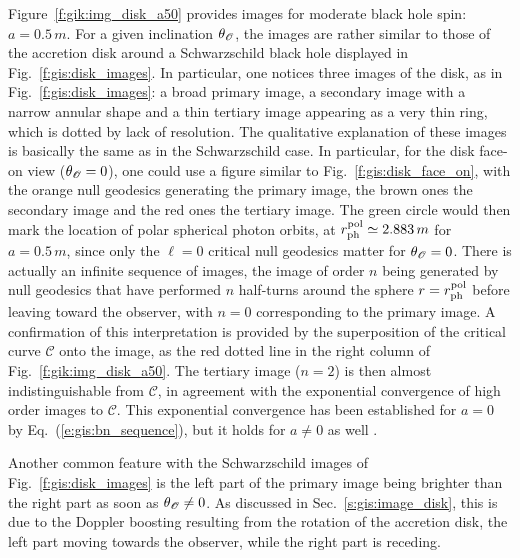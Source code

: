 Figure~\ref{f:gik:img_disk_a50} provides images for moderate black hole spin: $a = 0.5\, m$.
For a given inclination $\theta_{\mathscr{O}}$, the images are rather similar to those
of the accretion disk around a Schwarzschild
black hole displayed in Fig.~\ref{f:gis:disk_images}. In particular, one notices
three images of the disk, as in Fig.~\ref{f:gis:disk_images}: a broad primary image,
a secondary image with a narrow annular shape
and a thin tertiary image appearing as a very thin ring, which is dotted by lack of
resolution.
The qualitative explanation of these images is basically the same as in the Schwarzschild case.
In particular, for the disk face-on view ($\theta_{\mathscr{O}} = 0$), one could
use a figure similar to Fig.~\ref{f:gis:disk_face_on}, with the
orange null geodesics generating the primary image, the brown ones
the secondary image and the red ones the tertiary image. The green circle
would then mark the location of polar spherical photon orbits,
at $r_{\rm ph}^{\rm pol} \simeq 2.883\, m$ for $a=0.5\, m$,
since only the $\ell=0$ critical null geodesics matter for $\theta_{\mathscr{O}} = 0$.
There is actually an infinite sequence of images, the
image of order $n$ being generated by null geodesics that have performed
$n$ half-turns around the sphere $r=r_{\rm ph}^{\rm pol}$ before
leaving toward the observer, with $n=0$ corresponding to the primary image.
A confirmation of this interpretation is provided by the superposition
of the critical curve $\mathscr{C}$ onto the image, as the red dotted line in the
right column of Fig.~\ref{f:gik:img_disk_a50}. The tertiary image ($n=2$) is then
almost indistinguishable from $\mathscr{C}$, in agreement with the exponential
convergence of high order images to $\mathscr{C}$. This exponential convergence
has been established for $a=0$ by Eq.~(\ref{e:gis:bn_sequence}),
but it holds for $a \neq 0$ as well \cite{GrallL20a}.

Another common feature with the Schwarzschild images of Fig.~\ref{f:gis:disk_images}
is the left part of the primary image being brighter than the right part
as soon as $\theta_{\mathscr{O}} \neq 0$. As discussed in Sec.~\ref{s:gis:image_disk},
this is due to the Doppler boosting resulting from the rotation of the
accretion disk, the left part moving towards the observer, while the right
part is receding.

